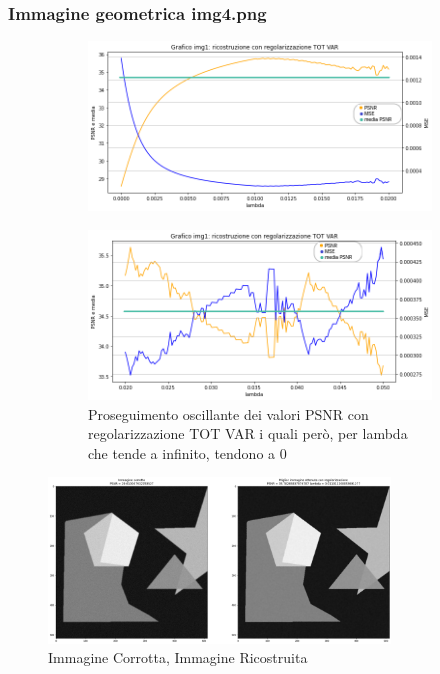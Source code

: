 \newpage
{\color{rred}\subsubsection{Immagine geometrica img4.png}}
\begin{figure}[H]
    \centering
    \begin{subfigure}{0.8\textwidth}
    \includegraphics[width=\textwidth]{IMMAGINI_RELAZIONE/grafico4TOTVAR_riserva.png}
    \end{subfigure}
    \begin{subfigure}{0.8\textwidth}
        \includegraphics[width=\textwidth]{IMMAGINI_RELAZIONE/proseguimentoGraficoTOTVAR4.png}
        \caption{Proseguimento oscillante dei valori PSNR con regolarizzazione TOT VAR i quali però, per lambda che tende a infinito, tendono a 0}
    \end{subfigure}
    \includegraphics[width=0.81\textwidth]{IMMAGINI_RELAZIONE/ricostruzione4TOTVAR.png}
    \caption{Immagine Corrotta, Immagine Ricostruita}
\end{figure}
